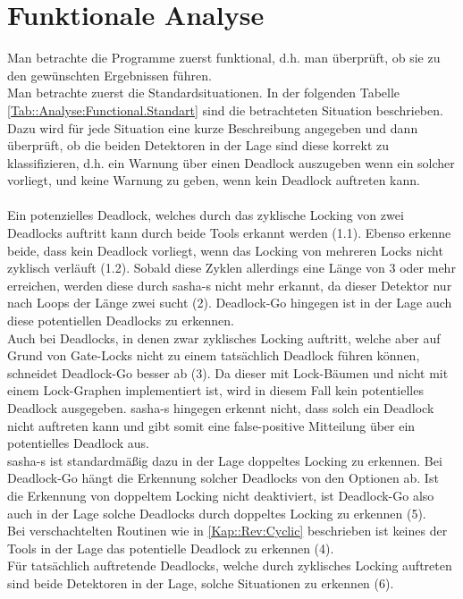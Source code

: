 \section{Funktionale Analyse}
Man betrachte die Programme zuerst funktional, d.h. man überprüft, ob sie zu den 
gewünschten Ergebnissen führen.\\
Man betrachte zuerst die Standardsituationen. In der folgenden Tabelle 
\ref{Tab::Analyse:Functional.Standart} sind die 
betrachteten Situation beschrieben. Dazu wird für jede Situation eine kurze 
Beschreibung angegeben und dann überprüft, ob die beiden Detektoren in der Lage 
sind diese korrekt zu klassifizieren, d.h. ein Warnung über einen Deadlock auszugeben
wenn ein solcher vorliegt, und keine Warnung zu geben, wenn kein Deadlock auftreten
kann.\\\\
Ein potenzielles Deadlock, welches 
durch das zyklische Locking von zwei Deadlocks auftritt kann durch beide Tools
erkannt werden (1.1). Ebenso erkenne beide, dass kein Deadlock vorliegt, wenn das 
Locking von mehreren Locks nicht zyklisch verläuft (1.2).
Sobald diese Zyklen allerdings eine Länge von 3 oder mehr 
erreichen, werden diese durch sasha-s nicht mehr erkannt, da dieser 
Detektor nur nach Loops der Länge zwei sucht (2). Deadlock-Go 
hingegen ist in der Lage auch diese potentiellen Deadlocks zu erkennen.\\
Auch bei Deadlocks, in denen zwar zyklisches Locking auftritt, welche aber 
auf Grund von Gate-Locks nicht zu einem tatsächlich Deadlock führen können,
schneidet Deadlock-Go besser ab (3). Da dieser mit Lock-Bäumen und nicht mit einem
Lock-Graphen implementiert ist, wird in diesem Fall kein potentielles Deadlock 
ausgegeben. sasha-s hingegen erkennt nicht, dass solch ein Deadlock nicht 
auftreten kann und gibt somit eine false-positive Mitteilung über ein potentielles 
Deadlock aus.\\ 
sasha-s ist standardmäßig dazu in  der Lage doppeltes Locking zu erkennen.
Bei Deadlock-Go hängt die Erkennung solcher Deadlocks von den Optionen ab.
Ist die Erkennung von doppeltem Locking nicht deaktiviert, ist Deadlock-Go also auch in 
der Lage solche Deadlocks durch doppeltes Locking zu erkennen (5). \\ 
Bei verschachtelten Routinen wie in \ref{Kap::Rev:Cyclic} beschrieben ist 
keines der Tools in der Lage das potentielle Deadlock zu erkennen (4).\\
Für tatsächlich auftretende Deadlocks, welche durch zyklisches Locking auftreten 
sind beide Detektoren in der Lage, solche Situationen zu erkennen (6).\\\\
